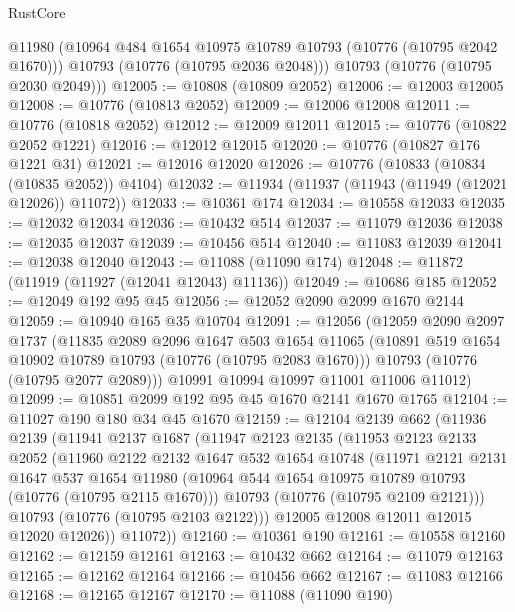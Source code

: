 \begin{lexlean}{RustCore}
\begin{coremodule}
        @11980
        (@10964 @484 @1654 @10975 @10789 @10793 (@10776 (@10795 @2042 @1670)))
        @10793
        (@10776 (@10795 @2036 @2048)))
      @10793
      (@10776 (@10795 @2030 @2049)))
@12005 := @10808 (@10809 @2052)
@12006 := @12003 @12005
@12008 := @10776 (@10813 @2052)
@12009 := @12006 @12008
@12011 := @10776 (@10818 @2052)
@12012 := @12009 @12011
@12015 := @10776 (@10822 @2052 @1221)
@12016 := @12012 @12015
@12020 := @10776 (@10827 @176 @1221 @31)
@12021 := @12016 @12020
@12026 := @10776 (@10833 (@10834 (@10835 @2052)) @4104)
@12032 := @11934 (@11937 (@11943 (@11949 (@12021 @12026)) @11072))
@12033 := @10361 @174
@12034 := @10558 @12033
@12035 := @12032 @12034
@12036 := @10432 @514
@12037 := @11079 @12036
@12038 := @12035 @12037
@12039 := @10456 @514
@12040 := @11083 @12039
@12041 := @12038 @12040
@12043 := @11088 (@11090 @174)
@12048 := @11872 (@11919 (@11927 (@12041 @12043) @11136))
@12049 := @10686 @185
@12052 := @12049 @192 @95 @45
@12056 := @12052 @2090 @2099 @1670 @2144
@12059 := @10940 @165 @35 @10704
@12091 := @12056
    (@12059
      @2090
      @2097
      @1737
      (@11835
        @2089
        @2096
        @1647
        @503
        @1654
        @11065
        (@10891 @519 @1654 @10902 @10789 @10793 (@10776 (@10795 @2083 @1670)))
        @10793
        (@10776 (@10795 @2077 @2089)))
      @10991
      @10994
      @10997
      @11001
      @11006
      @11012)
@12099 := @10851 @2099 @192 @95 @45 @1670 @2141 @1670 @1765
@12104 := @11027 @190 @180 @34 @45 @1670
@12159 := @12104
    @2139
    @662
    (@11936
      @2139
      (@11941
        @2137
        @1687
        (@11947
          @2123
          @2135
          (@11953
            @2123
            @2133
            @2052
            (@11960
              @2122
              @2132
              @1647
              @532
              @1654
              @10748
              (@11971
                @2121
                @2131
                @1647
                @537
                @1654
                @11980
                (@10964 @544 @1654 @10975 @10789 @10793 (@10776 (@10795 @2115 @1670)))
                @10793
                (@10776 (@10795 @2109 @2121)))
              @10793
              (@10776 (@10795 @2103 @2122)))
            @12005
            @12008
            @12011
            @12015
            @12020
            @12026))
        @11072))
@12160 := @10361 @190
@12161 := @10558 @12160
@12162 := @12159 @12161
@12163 := @10432 @662
@12164 := @11079 @12163
@12165 := @12162 @12164
@12166 := @10456 @662
@12167 := @11083 @12166
@12168 := @12165 @12167
@12170 := @11088 (@11090 @190)

\end{coremodule}
\end{lexlean}

